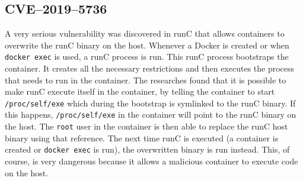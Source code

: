 \subsection{CVE--2019--5736}
A very serious vulnerability was discovered in runC that allows containers to overwrite the runC binary on the host. Whenever a Docker is created or when \lstinline{docker exec} is used, a runC process is run. This runC process bootstraps the container. It creates all the necessary restrictions and then executes the process that needs to run in the container. The researches found that it is possible to make runC execute itself in the container, by telling the container to start \lstinline{/proc/self/exe} which during the bootstrap is symlinked to the runC binary\cite{CVE-2019-5736-DragonSector}\cite{CVE-2019-5736-Github}. If this happens, \lstinline{/proc/self/exe} in the container will point to the runC binary on the host. The \lstinline{root} user in the container is then able to replace the runC host binary using that reference. The next time runC is executed (a container is created or \lstinline{docker exec} is run), the overwritten binary is run instead. This, of course, is very dangerous because it allows a malicious container to execute code on the host.
